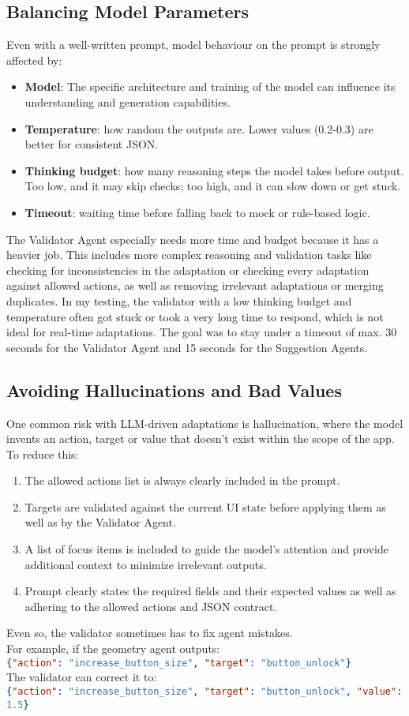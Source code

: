 \subsection{Balancing Model Parameters}
Even with a well-written prompt, model behaviour on the prompt is strongly affected by:
\begin{itemize}
    \item \textbf{Model}: The specific architecture and training of the model can influence its understanding and generation capabilities.
    \item \textbf{Temperature}: how random the outputs are. Lower values (0.2-0.3) are better for consistent JSON.
    \item \textbf{Thinking budget}: how many reasoning steps the model takes before output. Too low, and it may skip checks; too high, and it can slow down or get stuck.
    \item \textbf{Timeout}: waiting time before falling back to mock or rule-based logic.
\end{itemize}
The Validator Agent especially needs more time and budget because it has a heavier job. This includes more complex reasoning and validation tasks like checking for inconsistencies in the adaptation or checking every adaptation against allowed actions, as well as removing irrelevant adaptations or merging duplicates.
In my testing, the validator with a low thinking budget and temperature often got stuck or took a very long time to respond, which is not ideal for real-time adaptations. The goal was to stay under a timeout of max. 30 seconds for the Validator Agent and 15 seconds for the Suggestion Agents.

\subsection{Avoiding Hallucinations and Bad Values}
One common risk with LLM-driven adaptations is hallucination, where the model invents an action, target or value that doesn’t exist within the scope of the app.
To reduce this:
\begin{enumerate}
    \item The allowed actions list is always clearly included in the prompt.
    \item Targets are validated against the current UI state before applying them as well as by the Validator Agent.
    \item A list of focus items is included to guide the model's attention and provide additional context to minimize irrelevant outputs.
    \item Prompt clearly states the required fields and their expected values as well as adhering to the allowed actions and JSON contract.
\end{enumerate}
Even so, the validator sometimes has to fix agent mistakes.\\
For example, if the geometry agent outputs: \\
\lstinline[language=json]|{"action": "increase_button_size", "target": "button_unlock"}|\\
The validator can correct it to:\\
\lstinline[language=json]|{"action": "increase_button_size", "target": "button_unlock", "value": 1.5}|

